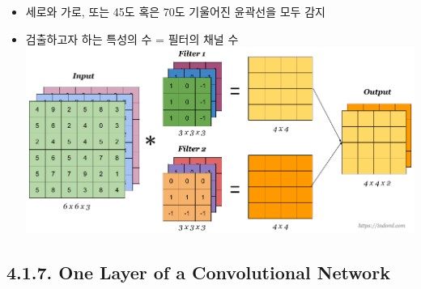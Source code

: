 \documentclass[11pt]{article}
\makeatletter
\def\maxwidth{\ifdim\Gin@nat@width>\linewidth\linewidth
    \else\Gin@nat@width\fi}
\let\Oldincludegraphics\includegraphics
\renewcommand{\includegraphics}[1]{\Oldincludegraphics[width=.8\maxwidth]{#1}}
\providecommand{\tightlist}{%
      \setlength{\itemsep}{0pt}\setlength{\parskip}{0pt}}
\makeatother
\begin{document}
\begin{itemize}
  \begin{itemize}
  \tightlist
  \item
    세로와 가로, 또는 45도 혹은 70도 기울어진 윤곽선을 모두 감지\\
  \item
    검출하고자 하는 특성의 수 = 필터의 채널 수\\
     \includegraphics{./Images/c4week1/14-4.png}
  \end{itemize}
\end{itemize}

    \subsection{4.1.7. One Layer of a Convolutional
Network}\label{one-layer-of-a-convolutional-network}
\end{document}

